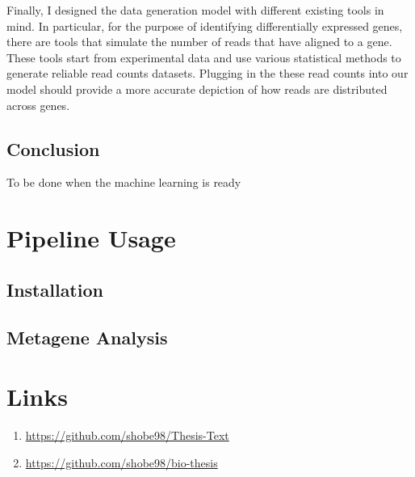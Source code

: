 \documentclass[12pt]{article}
\begin{document}
Finally, I designed the data generation model with different existing tools in mind. In particular, for the purpose of identifying differentially expressed genes, there are tools that simulate the number of reads that have aligned to a gene. These tools start from experimental data \cite{Griebel2012, Gerard2020} and use various statistical methods to generate reliable read counts datasets. Plugging in the these read counts into our model should provide a more accurate depiction of how reads are distributed across genes. 

\subsection{Conclusion}

To be done when the machine learning is ready

\section{Pipeline Usage}
\subsection{Installation}

\subsection{Metagene Analysis}



\section{Links}
\begin{enumerate}
    \item  \url{https://github.com/shobe98/Thesis-Text}
\item \url{https://github.com/shobe98/bio-thesis}

\end{enumerate}




\printglossary[type=\acronymtype,title=Abbreviations]






\nocite{*}
\end{document}
